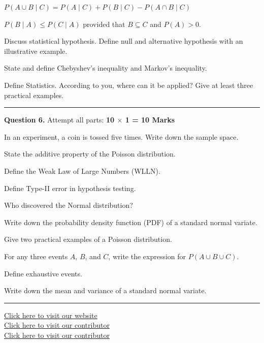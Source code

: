 \documentclass[11pt,a4paper]{article}
\begin{document}
\begin{parts}
\begin{parts}
    \item $P(A \cup B \mid C) = P(A \mid C) + P(B \mid C) - P(A \cap B \mid C)$
    \item $P(B \mid A) \le P(C \mid A)$ provided that $B \subseteq C$ and $P(A) > 0$.
  \end{parts}
  \item Discuss statistical hypothesis. Define null and alternative hypothesis with an illustrative example.
  \item State and define Chebyshev's inequality and Markov's inequality.
  \item Define Statistics. According to you, where can it be applied? Give at least three practical examples.
\end{parts}

\bigskip


\rule{\linewidth}{0.4pt}\smallskip




\noindent   \textbf{Question 6.} Attempt all parts: \hfill   \textbf{10 $ \times$ 1 = 10 Marks}

\begin{parts}
  \item In an experiment, a coin is tossed five times. Write down the sample space.
  \item State the additive property of the Poisson distribution.
  \item Define the Weak Law of Large Numbers (WLLN).
  \item Define Type-II error in hypothesis testing.
  \item Who discovered the Normal distribution?
  \item Write down the probability density function (PDF) of a standard normal variate.
  \item Give two practical examples of a Poisson distribution.
  \item For any three events $A$, $B$, and $C$, write the expression for $P(A \cup B \cup C)$.
  \item Define exhaustive events.
  \item Write down the mean and variance of a standard normal variate.
\end{parts}

\vfill
\rule{\linewidth}{0.4pt}

\begin{center}\small
\href{https://bhu-exam.vercel.app/}{Click here to visit our website}\\[4pt]\href{https://me-aryan.vercel.app/}{Click here to visit our contributor}\\[4pt]\href{https://quashan-me.vercel.app/}{Click here to visit our contributor}
\end{center}
\end{document}

